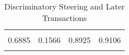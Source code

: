
\begin{table}[!htbp] \centering 
  \caption{Discriminatory Steering and Later Transactions} 
  \label{} 
\begin{tabular}{@{\extracolsep{5pt}} D{.}{.}{-4} D{.}{.}{-4} D{.}{.}{-4} D{.}{.}{-4} } 
\\[-1.8ex]\hline 
\hline \\[-1.8ex] 
0.6885 & 0.1566 & 0.8925 & 0.9106 \\ 
\hline \\[-1.8ex] 
\end{tabular} 
\end{table} 
